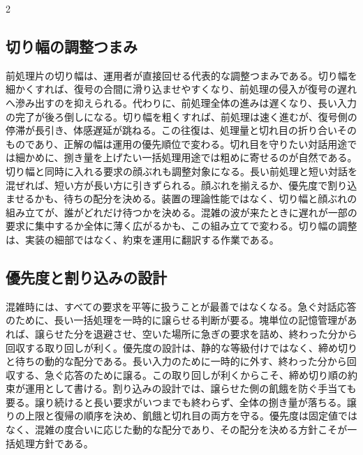 \documentclass[lualatex,a4paper,10pt]{jlreq}
\begin{document}
\begin{multicols}{2}
\subsection{切り幅の調整つまみ}
前処理片の切り幅は、運用者が直接回せる代表的な調整つまみである。切り幅を細かくすれば、復号の合間に滑り込ませやすくなり、前処理の侵入が復号の遅れへ滲み出すのを抑えられる。代わりに、前処理全体の進みは遅くなり、長い入力の完了が後ろ倒しになる。切り幅を粗くすれば、前処理は速く進むが、復号側の停滞が長引き、体感遅延が跳ねる。この往復は、処理量と切れ目の折り合いそのものであり、正解の幅は運用の優先順位で変わる。切れ目を守りたい対話用途では細かめに、捌き量を上げたい一括処理用途では粗めに寄せるのが自然である\autocite{sarathi}。切り幅と同時に入れる要求の顔ぶれも調整対象になる。長い前処理と短い対話を混ぜれば、短い方が長い方に引きずられる。顔ぶれを揃えるか、優先度で割り込ませるかも、待ちの配分を決める。装置の理論性能ではなく、切り幅と顔ぶれの組み立てが、誰がどれだけ待つかを決める。混雑の波が来たときに遅れが一部の要求に集中するか全体に薄く広がるかも、この組み立てで変わる。切り幅の調整は、実装の細部ではなく、約束を運用に翻訳する作業である。

\subsection{優先度と割り込みの設計}
混雑時には、すべての要求を平等に扱うことが最善ではなくなる。急ぐ対話応答のために、長い一括処理を一時的に譲らせる判断が要る。塊単位の記憶管理があれば、譲らせた分を退避させ、空いた場所に急ぎの要求を詰め、終わった分から回収する取り回しが利く\autocite{pagedattn}。優先度の設計は、静的な等級付けではなく、締め切りと待ちの動的な配分である。長い入力のために一時的に外す、終わった分から回収する、急ぐ応答のために譲る。この取り回しが利くからこそ、締め切り順の約束が運用として書ける。割り込みの設計では、譲らせた側の飢餓を防ぐ手当ても要る。譲り続けると長い要求がいつまでも終わらず、全体の捌き量が落ちる。譲りの上限と復帰の順序を決め、飢餓と切れ目の両方を守る。優先度は固定値ではなく、混雑の度合いに応じた動的な配分であり、その配分を決める方針こそが一括処理方針である。

\end{multicols}
\end{document}
